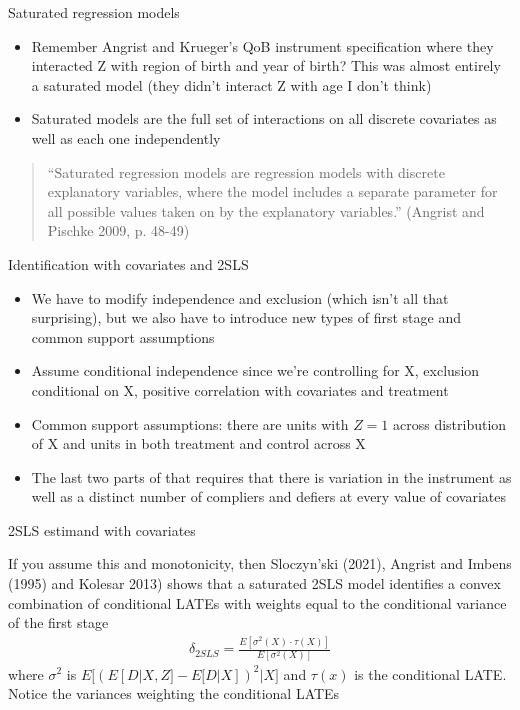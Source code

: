 \documentclass{beamer}
\begin{document}
\begin{frame}{Saturated regression models}

  \begin{itemize}
    \item Remember Angrist and Krueger's QoB instrument specification where they interacted Z with region of birth and year of birth?  This was almost entirely a saturated model (they didn't interact Z with age I don't think)
    \item Saturated models are the full set of interactions on all discrete covariates as well as each one independently
  \end{itemize}

  \bigskip

  \begin{quote}
    ``Saturated regression models are regression models with discrete explanatory variables, where the model includes a separate parameter for all possible values taken on by the explanatory variables.'' (Angrist and Pischke 2009, p. 48-49)
  \end{quote}

\end{frame}


\begin{frame}{Identification with covariates and 2SLS}

  \begin{itemize}
    \item We have to modify independence and exclusion (which isn't all that surprising), but we also have to introduce new types of first stage and common support assumptions
    \item Assume conditional independence since we're controlling for X, exclusion conditional on X, positive correlation with covariates and treatment
    \item Common support assumptions: there are units with $Z=1$ across distribution of X and units in both treatment and control across X
    \item The last two parts of that requires that there is variation in the instrument as well as a distinct number of compliers and defiers at every value of covariates
  \end{itemize}

\end{frame}

\begin{frame}{2SLS estimand with covariates}

  If you assume this and monotonicity, then Sloczyn'ski (2021),  Angrist and Imbens (1995) and Kolesar 2013) shows that a saturated 2SLS model identifies a convex combination of conditional LATEs with weights equal to the conditional variance of the first stage
  \begin{eqnarray*}
    \delta_{2SLS} = \frac{E[\sigma^2(X) \cdot \tau(X) ]}{E[\sigma^2(X)]}
  \end{eqnarray*}where $\sigma^2$ is $E \bigg [ (E[D|X,Z] - E[D|X] )^2 | X \bigg ]$ and $\tau(x)$ is the conditional LATE.  Notice the variances weighting the conditional LATEs

\end{frame}
\end{document}

